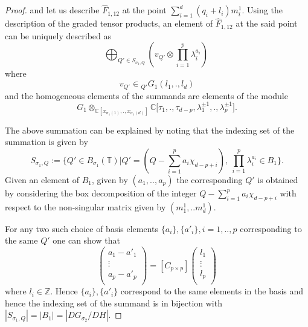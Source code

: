 \documentclass[10pt]{amsart}
\numberwithin{equation}{subsection}
\begin{document}
\begin{proof}
and let us describe $\hat{F}_{1,12}$ at the point $\sum_{i=1}^{d}(q_i+l_i)m^1_i.$\newline
Using the description of the graded tensor products, an element of $\hat{F}_{1,12}$ at the said point can be uniquely described as $$\bigoplus_{Q'\in S_{\sigma_1,Q}}(v_{Q'}\otimes \prod_{i=1}^{p}\lambda_i^{a_i})\ $$ where $$v_{Q'}\in {}_{Q'}G_{1}(l_1,.,l_d)$$ and %
the homogeneous elements of the summands are elements of the module $$G_1\otimes_{\mathbb{C}[x_{\sigma_{1}(1)},.,x_{\sigma_{1}(d)}]} \mathbb{C}\bigg[\tau_1,.,\tau_{d-p},\lambda_{1}^{\pm 1},.,\lambda_{p}^{\pm 1}\bigg] .$$\par
The above summation can be explained by noting that the indexing set of the summation is given by
$$S_{\sigma_1,Q}:=\big \{Q'\in B_{\sigma_{1}}(\mathbb{T})\bigg|Q'=(Q-\sum_{i=1}^{p}a_{i}\chi_{d-p+i})  ,\ \prod_{i=1}^{p}\lambda_{i}^{a_i}\in B_1  \big \}.$$
Given an element of $B_1$, given by $(a_1,..,a_p)$ the corresponding $Q'$ is obtained by considering the box decomposition of the integer $Q-\sum_{i=1}^{p}a_{i}\chi_{d-p+i}$ with respect to the non-singular matrix given by $(m^1_1,..m^1_d).$\par For any two such choice of basis elements $\{a_i\},\{a'_i\},i=1,..,p$ corresponding to the same $Q'$ one can show that $$\begin{pmatrix}
  a_{1}-a'_{1} \\
  \vdots \\
  a_{p}-a'_p \\
\end{pmatrix}=[C_{p\times p}]\begin{pmatrix}
 l_1\\
 \vdots\\
 l_p\\
\end{pmatrix}$$ 
where $l_i \in \mathbb{Z}.$ Hence $\{a_i\},\{a'_i\}$ correspond to the same elements in the basis and hence the indexing set of the summand is in bijection with $|S_{\sigma_1,Q}|=|B_1|=|DG_{\sigma_2}/DH|.$


\end{proof}
\end{document}
